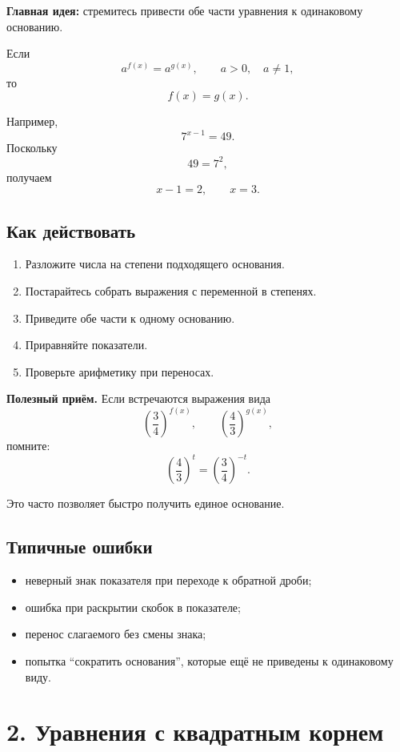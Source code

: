 \documentclass[a4paper,12pt]{article}
\newcommand{\key}[1]{\textcolor{darkaccent}{\textbf{#1}}}
\begin{document}
\key{Главная идея:} стремитесь привести обе части уравнения к одинаковому основанию.

Если
\[
a^{f(x)}=a^{g(x)}, \qquad
a>0,\quad a\ne1,
\]
то
\[
f(x)=g(x).
\]

Например,
\[
7^{x-1}=49.
\]
Поскольку
\[
49=7^2,
\]
получаем
\[
x-1=2,
\qquad
x=3.
\]

\subsection*{Как действовать}

\begin{enumerate}
    \item Разложите числа на степени подходящего основания.
    \item Постарайтесь собрать выражения с переменной в степенях.
    \item Приведите обе части к одному основанию.
    \item Приравняйте показатели.
    \item Проверьте арифметику при переносах.
\end{enumerate}

\key{Полезный приём.}
Если встречаются выражения вида
\[
\left(\frac34\right)^{f(x)},
\qquad
\left(\frac43\right)^{g(x)},
\]
помните:
\[
\left(\frac43\right)^t
=
\left(\frac34\right)^{-t}.
\]

Это часто позволяет быстро получить единое основание.

\subsection*{Типичные ошибки}

\begin{itemize}
    \item неверный знак показателя при переходе к обратной дроби;
    \item ошибка при раскрытии скобок в показателе;
    \item перенос слагаемого без смены знака;
    \item попытка ``сократить основания'', которые ещё не приведены к одинаковому виду.
\end{itemize}


\section*{\textcolor{darkaccent}{2. Уравнения с квадратным корнем}}
\end{document}
